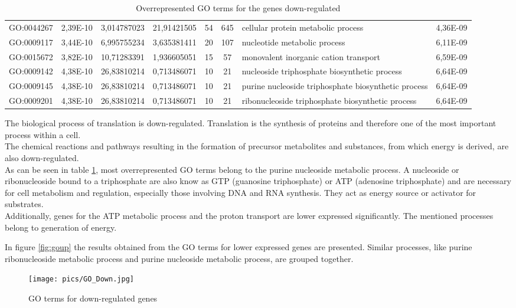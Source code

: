 \documentclass[12pt, a4paper]{report}
\begin{document}
\begin{table}[H]
\begin{tabular}{c|c|c|c|c|c|p{4cm}|c}
GO:0044267&	2,39E-10&	3,014787023&	21,91421505&	54&	645&	cellular protein metabolic process&	4,36E-09\\
GO:0009117&	3,44E-10&	6,995755234&	3,635381411&	20&	107&	nucleotide metabolic process&	6,11E-09\\
GO:0015672&	3,82E-10&	10,71283391&	1,936605051&	15&	57&	monovalent inorganic cation transport&	6,59E-09\\
GO:0009142&	4,38E-10&	26,83810214&	0,713486071&	10&	21&	nucleoside triphosphate biosynthetic process&	6,64E-09\\
GO:0009145&	4,38E-10&	26,83810214&	0,713486071&	10&	21&	purine nucleoside triphosphate biosynthetic process&	6,64E-09\\
GO:0009201&	4,38E-10&	26,83810214&	0,713486071&	10&	21&	ribonucleoside triphosphate biosynthetic process&	6,64E-09\\
\hline
	\end{tabular}
	\caption{Overrepresented GO terms for the genes down-regulated}
	\label{tab:GOdown}
\end{table}

The biological process of translation is down-regulated. Translation is the synthesis of proteins and therefore one of the most important process within a cell.\\
The chemical reactions and pathways resulting in the formation of precursor metabolites and substances, from which energy is derived, are also down-regulated. \\
As can be seen in table \ref{tab:GOdown}, most overrepresented GO terms belong to the purine nucleoside metabolic process. A nucleoside or ribonucleoside bound to a triphosphate are also know as GTP (guanosine triphosphate) or ATP (adenosine triphosphate) and are necessary for cell metabolism and regulation, especially those involving DNA and RNA synthesis. They act as energy source or activator for substrates.\\
Additionally, genes for the ATP metabolic process and the proton transport are lower expressed significantly. The mentioned processes belong to generation of energy. 


In figure \ref{fig:goup} the results obtained from the GO terms for lower expressed genes are presented. Similar processes, like purine ribonucleoside metabolic process and purine nucleoside metabolic process, are grouped together. 

\begin{figure}[H]
	\centering	
	\texttt{[image: pics/GO\_Down.jpg]}
	\caption[GO terms for down-regulated genes]
	{GO terms for down-regulated genes}
	\label{fig:godown}
\end{figure}
\end{document}
